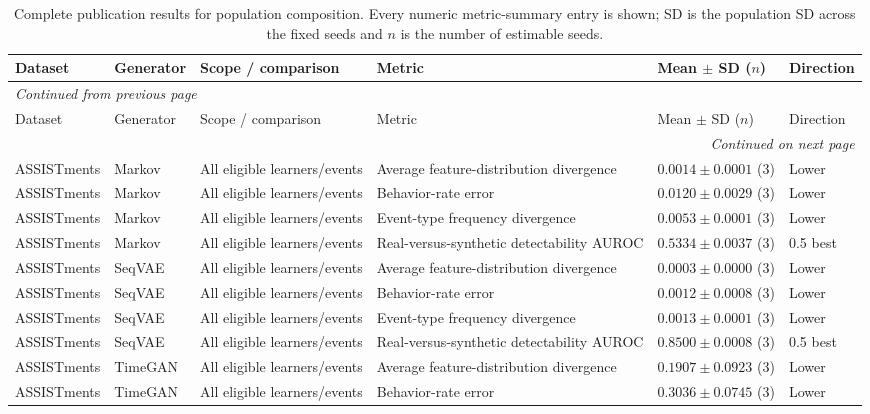 \scriptsize
\setlength{\tabcolsep}{3pt}
\begin{longtable}{@{}p{2.25cm}p{2.05cm}p{4.7cm}p{5.0cm}p{2.6cm}p{1.25cm}@{}}
\caption{Complete publication results for population composition. Every numeric metric-summary entry is shown; SD is the population SD across the fixed seeds and $n$ is the number of estimable seeds.}\label{tab:supp-population-composition}\\
\toprule
Dataset & Generator & Scope / comparison & Metric & Mean $\pm$ SD ($n$) & Direction \\
\midrule
\endfirsthead
\multicolumn{6}{l}{\textit{Continued from previous page}}\\
\toprule
Dataset & Generator & Scope / comparison & Metric & Mean $\pm$ SD ($n$) & Direction \\
\midrule
\endhead
\midrule
\multicolumn{6}{r}{\textit{Continued on next page}}\\
\endfoot
\bottomrule
\endlastfoot
ASSISTments & Markov & All eligible learners/events & Average feature-distribution divergence & $0.0014 \mathbin{\pm} 0.0001$ (3) & Lower \\
ASSISTments & Markov & All eligible learners/events & Behavior-rate error & $0.0120 \mathbin{\pm} 0.0029$ (3) & Lower \\
ASSISTments & Markov & All eligible learners/events & Event-type frequency divergence & $0.0053 \mathbin{\pm} 0.0001$ (3) & Lower \\
ASSISTments & Markov & All eligible learners/events & Real-versus-synthetic detectability AUROC & $0.5334 \mathbin{\pm} 0.0037$ (3) & 0.5 best \\
ASSISTments & SeqVAE & All eligible learners/events & Average feature-distribution divergence & $0.0003 \mathbin{\pm} 0.0000$ (3) & Lower \\
ASSISTments & SeqVAE & All eligible learners/events & Behavior-rate error & $0.0012 \mathbin{\pm} 0.0008$ (3) & Lower \\
ASSISTments & SeqVAE & All eligible learners/events & Event-type frequency divergence & $0.0013 \mathbin{\pm} 0.0001$ (3) & Lower \\
ASSISTments & SeqVAE & All eligible learners/events & Real-versus-synthetic detectability AUROC & $0.8500 \mathbin{\pm} 0.0008$ (3) & 0.5 best \\
ASSISTments & TimeGAN & All eligible learners/events & Average feature-distribution divergence & $0.1907 \mathbin{\pm} 0.0923$ (3) & Lower \\
ASSISTments & TimeGAN & All eligible learners/events & Behavior-rate error & $0.3036 \mathbin{\pm} 0.0745$ (3) & Lower \\

\end{longtable}
